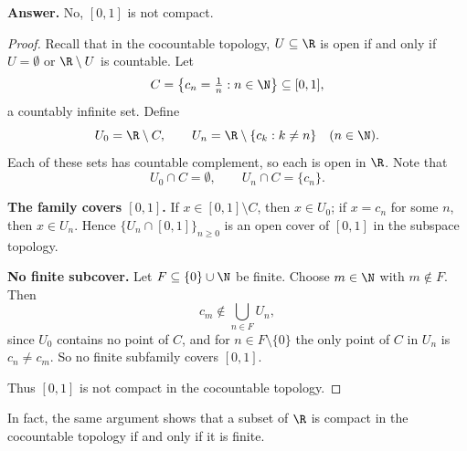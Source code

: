 
\textbf{Answer.} No, $[0,1]$ is not compact.

\begin{proof}
Recall that in the cocountable topology, $U\subseteq\R$ is open if and only if $U=\emptyset$ or
$\R\setminus U$ is countable. Let
\[ C=\bigl\{c_n=\tfrac1n : n\in\N\bigr\}\subseteq[0,1], \]
a countably infinite set. Define
\[ U_0=\R\setminus C,\qquad U_n=\R\setminus\{c_k : k\ne n\}\quad(n\in\N). \]
Each of these sets has countable complement, so each is open in $\R$. Note that
\[ U_0\cap C=\emptyset,\qquad U_n\cap C=\{c_n\}. \]

\textbf{The family covers $[0,1]$.} If $x\in[0,1]\setminus C$, then $x\in U_0$; if $x=c_n$ for
some $n$, then $x\in U_n$. Hence $\{U_n\cap[0,1]\}_{n\ge0}$ is an open cover of $[0,1]$ in the
subspace topology.

\textbf{No finite subcover.} Let $F\subseteq\{0\}\cup\N$ be finite. Choose $m\in\N$ with
$m\notin F$. Then
\[ c_m\notin\bigcup_{n\in F}U_n, \]
since $U_0$ contains no point of $C$, and for $n\in F\setminus\{0\}$ the only point of $C$ in
$U_n$ is $c_n\ne c_m$. So no finite subfamily covers $[0,1]$.

Thus $[0,1]$ is not compact in the cocountable topology.
\end{proof}

\begin{remark}
In fact, the same argument shows that a subset of $\R$ is compact in the cocountable topology if
and only if it is finite.
\end{remark}
